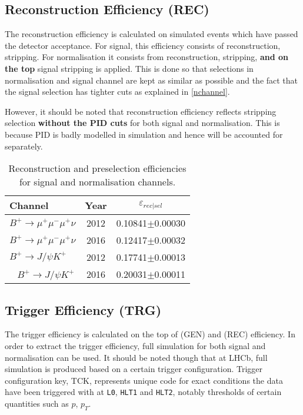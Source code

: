 \subsection{Reconstruction Efficiency (REC)}
The reconstruction efficiency is calculated on simulated events which have passed the detector acceptance. For signal, this efficiency consists of reconstruction, stripping. For normalisation it consists from reconstruction, stripping, \textbf{and on the top} signal stripping is applied. This is done so that selections in normalisation and signal channel are kept as similar as possible and the fact that the signal selection has tighter cuts as explained in \autoref{nchannel}.

However, it should be noted that reconstruction efficiency reflects stripping selection \textbf{without the PID cuts} for both signal and normalisation. This is because \gls{PID} is badly modelled in simulation and hence will be accounted for separately.

  \begin{table}[H]
                \begin{center}
        \begin{tabular}{l c c }

		Channel & Year & $\varepsilon_{rec|sel}$ \\ \hline
                $B^{+} \rightarrow \mu^{+} \mu^{-} \mu^{+} \nu$ & 2012 &  0.10841$\pm$0.00030 \\
                $B^{+} \rightarrow \mu^{+} \mu^{-} \mu^{+} \nu$ & 2016 &  0.12417$\pm$0.00032 \\ \hline
                $B^{+} \rightarrow J/\psi K^{+}$ & 2012 & 0.17741$\pm$0.00013 \\ \
                $B^{+} \rightarrow J/\psi K^{+}$ & 2016 &  0.20031$\pm$0.00011 \\
		
		\hline
        \end{tabular}
        \end{center}
        \caption{Reconstruction and preselection efficiencies for signal and normalisation channels.}
        \label{tab:myreco}
        \end{table}


\subsection{Trigger Efficiency (TRG)}
\label{trigef}
 The trigger efficiency is calculated on the top of (GEN) and (REC) efficiency. In order to extract the trigger efficiency, full simulation for both signal and normalisation can be used. It should be noted though that at \gls{LHCb}, full simulation is produced based on a certain trigger configuration. Trigger configuration key, TCK, represents unique code for exact conditions the data have been triggered with at \texttt{L0}, \texttt{HLT1} and \texttt{HLT2}, notably thresholds of certain quantities such as $p$, $p_{T}$. 
 
